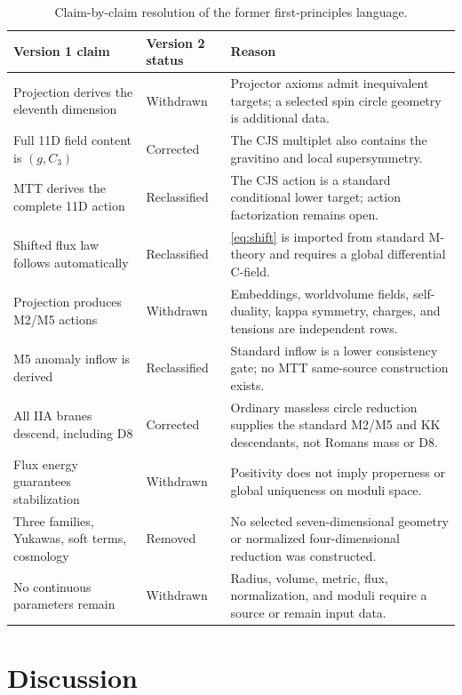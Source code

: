 \documentclass[11pt]{article}
\theoremstyle{definition}
\theoremstyle{remark}
\begin{document}
\begin{table}[htbp]
\centering
\small
\begin{tabularx}{\textwidth}{@{}p{}p{}X@{}}
\toprule
Version 1 claim & Version 2 status & Reason \\
\midrule
Projection derives the eleventh dimension
& Withdrawn
& Projector axioms admit inequivalent targets; a selected spin circle
  geometry is additional data. \\
Full 11D field content is \((g,C_3)\)
& Corrected
& The CJS multiplet also contains the gravitino and local supersymmetry. \\
MTT derives the complete 11D action
& Reclassified
& The CJS action is a standard conditional lower target; action
  factorization remains open. \\
Shifted flux law follows automatically
& Reclassified
& \cref{eq:shift} is imported from standard M-theory and requires a global
  differential C-field. \\
Projection produces M2/M5 actions
& Withdrawn
& Embeddings, worldvolume fields, self-duality, kappa symmetry, charges, and
  tensions are independent rows. \\
M5 anomaly inflow is derived
& Reclassified
& Standard inflow is a lower consistency gate; no MTT same-source
  construction exists. \\
All IIA branes descend, including D8
& Corrected
& Ordinary massless circle reduction supplies the standard M2/M5 and KK
  descendants, not Romans mass or D8. \\
Flux energy guarantees stabilization
& Withdrawn
& Positivity does not imply properness or global uniqueness on moduli space. \\
Three families, Yukawas, soft terms, cosmology
& Removed
& No selected seven-dimensional geometry or normalized four-dimensional
  reduction was constructed. \\
No continuous parameters remain
& Withdrawn
& Radius, volume, metric, flux, normalization, and moduli require a source or
  remain input data. \\
\bottomrule
\end{tabularx}
\caption{Claim-by-claim resolution of the former first-principles language.}
\label{tab:disposition}
\end{table}

\section{Discussion}
\end{document}
